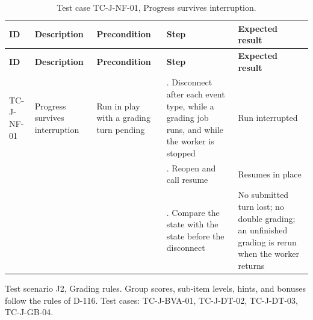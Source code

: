 {\small
\begin{longtable}{|>{\raggedright\arraybackslash}p{}|>{\raggedright\arraybackslash}p{}|>{\raggedright\arraybackslash}p{}|>{\raggedright\arraybackslash}p{}|>{\raggedright\arraybackslash}p{}|}
\caption{Test case TC-J-NF-01, Progress survives interruption.} \\
\hline
\textbf{ID} & \textbf{Description} & \textbf{Precondition} & \textbf{Step} & \textbf{Expected result} \\ \hline
\endfirsthead
\hline
\textbf{ID} & \textbf{Description} & \textbf{Precondition} & \textbf{Step} & \textbf{Expected result} \\ \hline
\endhead
TC-J-NF-01 & Progress survives interruption & Run in play with a grading turn pending & 1. Disconnect after each event type, while a grading job runs, and while the worker is stopped & Run interrupted \\ \hline
 &  &  & 2. Reopen and call resume & Resumes in place \\ \hline
 &  &  & 3. Compare the state with the state before the disconnect & No submitted turn lost; no double grading; an unfinished grading is rerun when the worker returns \\ \hline
\end{longtable}
}

Test scenario J2, Grading rules. Group scores, sub-item levels, hints, and bonuses follow the rules of D-116. Test cases: TC-J-BVA-01, TC-J-DT-02, TC-J-DT-03, TC-J-GB-04.

